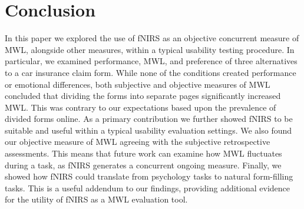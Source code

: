 \documentclass[../main/Replicate.tex]{subfiles}
\begin{document}
	\section{Conclusion}
	In this paper we explored the use of fNIRS as an objective concurrent measure of MWL, alongside other measures, within a typical usability testing procedure. In particular, we examined performance, MWL, and preference of three alternatives to a car insurance claim form. %
	While none of the conditions created performance or emotional differences, both subjective and objective measures of MWL concluded that dividing the forms into separate pages significantly increased MWL. 
This was contrary to our expectations based upon the prevalence of divided forms online. 
As a primary contribution we further showed fNIRS to be suitable and useful within a typical usability evaluation settings. 
We also found our objective measure of MWL agreeing with the subjective retrospective assessments. 
This means that future work can examine how MWL fluctuates during a task, as fNIRS generates a concurrent ongoing measure. 
Finally, we showed how fNIRS could translate from psychology tasks to natural form-filling tasks. 
This is a useful addendum to our findings, providing additional evidence for the utility of fNIRS as a MWL evaluation tool.
\\
\end{document}
